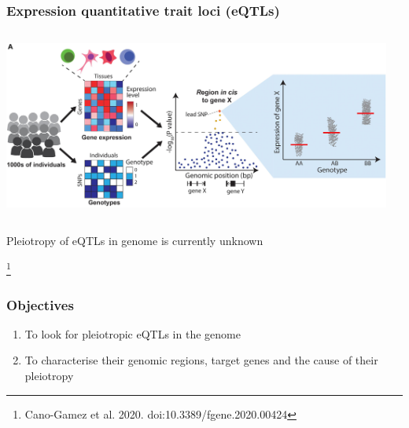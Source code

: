 \documentclass{beamer}
\newcommand\blfootnote[1]{%
    \begingroup
    \renewcommand\thefootnote{}\footnote{#1}%
    \addtocounter{footnote}{-1}%
    \endgroup
}
\begin{document}
    \begin{frame}
        \frametitle{Expression quantitative trait loci (eQTLs)}
        \begin{columns}
            \begin{column}{0.5\textwidth}
                \begin{center}
                    \includegraphics[width=\textwidth]{../presentation_230120_gold2022_paris/fig/doi_10.3389_fgene.2020.00424_fig4a.jpg}
                \end{center}
            \end{column}
            \begin{column}{0.5\textwidth}

            \end{column}
        \end{columns}
%
        \vfill
%
        Pleiotropy of eQTLs in genome is currently unknown

        \blfootnote{Cano-Gamez et al. 2020. doi:10.3389/fgene.2020.00424}
    \end{frame}

    \begin{frame}
        \frametitle{Objectives}

        \begin{enumerate}
            \item To look for pleiotropic eQTLs in the genome
            \item To characterise their genomic regions, target genes and the cause of their pleiotropy
        \end{enumerate}
    \end{frame}
\end{document}
